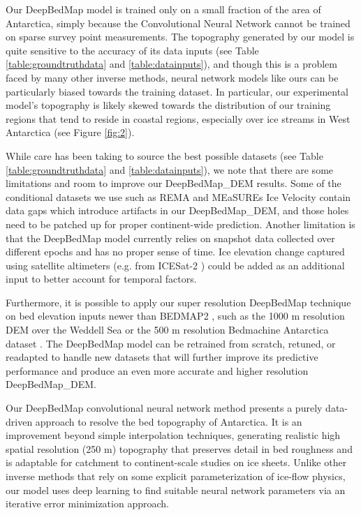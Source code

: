 \documentclass[tc, manuscript]{copernicus}
\begin{document}
Our DeepBedMap model is trained only on a small fraction of the area of Antarctica, simply because the Convolutional Neural Network cannot be trained on sparse survey point measurements.
The topography generated by our model is quite sensitive to the accuracy of its data inputs (see Table \ref{table:groundtruthdata} and \ref{table:datainputs}), and though this is a problem faced by many other inverse methods, neural network models like ours can be particularly biased towards the training dataset.
In particular, our experimental model's topography is likely skewed towards the distribution of our training regions that tend to reside in coastal regions, especially over ice streams in West Antarctica (see Figure \ref{fig:2}).

While care has been taking to source the best possible datasets (see Table \ref{table:groundtruthdata} and \ref{table:datainputs}), we note that there are some limitations and room to improve our DeepBedMap\_DEM results.
Some of the conditional datasets we use such as REMA \citep{HowatReferenceElevationModel2019} and MEaSUREs Ice Velocity \citep{RignotMEaSUREsInSARBasedAntarctica2017} contain data gaps which introduce artifacts in our DeepBedMap\_DEM, and those holes need to be patched up for proper continent-wide prediction.
Another limitation is that the DeepBedMap model currently relies on snapshot data collected over different epochs and has no proper sense of time.
Ice elevation change captured using satellite altimeters (e.g. from ICESat-2 \citep{MarkusIceCloudland2017}) could be added as an additional input to better account for temporal factors.

Furthermore, it is possible to apply our super resolution DeepBedMap technique on bed elevation inputs newer than BEDMAP2 \citep{FretwellBedmap2improvedice2013}, such as the 1000 m resolution DEM over the Weddell Sea \citep{Jeofry1KmBedTopography2017} or the 500 m resolution Bedmachine Antarctica dataset \citep{MorlighemMEaSUREsBedMachineAntarctica2019}.
The DeepBedMap model can be retrained from scratch, retuned, or readapted to handle new datasets that will further improve its predictive performance and produce an even more accurate and higher resolution DeepBedMap\_DEM.


\conclusions  %

Our DeepBedMap convolutional neural network method presents a purely data-driven approach to resolve the bed topography of Antarctica.
It is an improvement beyond simple interpolation techniques, generating realistic high spatial resolution (250 m) topography that preserves detail in bed roughness and is adaptable for catchment to continent-scale studies on ice sheets.
Unlike other inverse methods that rely on some explicit parameterization of ice-flow physics, our model uses deep learning to find suitable neural network parameters via an iterative error minimization approach.
\end{document}
